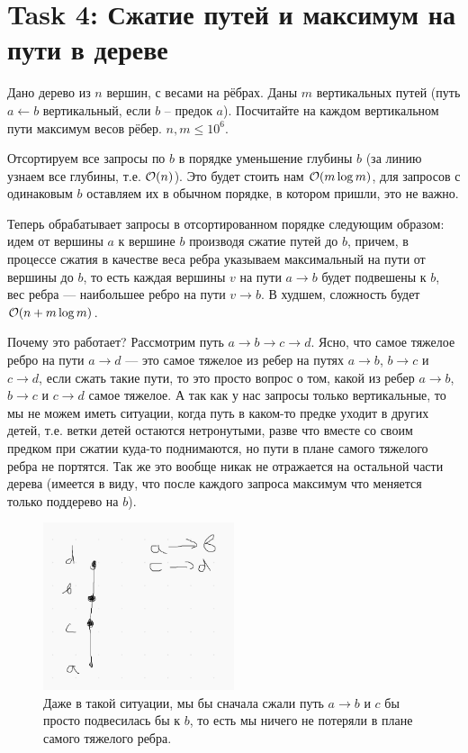 \section{Task 4: Сжатие путей и максимум на пути в дереве}
\begin{task}
    Дано дерево из $n$ вершин, с весами на рёбрах.
    Даны $m$ вертикальных путей (путь $a \leftarrow b$ вертикальный, если $b$ – предок $a$).
    Посчитайте на каждом вертикальном пути максимум весов рёбер. $n, m \leq 10^6$.
\end{task}

\begin{solution}
    Отсортируем все запросы по $b$ в порядке уменьшение глубины $b$ (за линию узнаем все глубины, т.е. $\mathcal{O}(n)$).
    Это будет стоить нам $\mathcal{O}(m\log m)$, для запросов с одинаковым $b$ оставляем их в обычном порядке, в котором пришли, это не важно.

    Теперь обрабатывает запросы в отсортированном порядке следующим образом: идем от вершины $a$ к вершине $b$ производя сжатие путей до $b$, причем, в процессе сжатия в качестве веса ребра указываем максимальный на пути от вершины до $b$, то есть каждая вершины $v$ на пути $a \rightarrow b$ будет подвешены к $b$, вес ребра --- наибольшее ребро на пути $v \rightarrow b$. В худшем, сложность будет $\mathcal{O}(n + m\log m)$.

    Почему это работает? Рассмотрим путь $a \rightarrow b \rightarrow c \rightarrow d$. Ясно, что самое тяжелое ребро на пути $a \rightarrow d$ --- это самое тяжелое из ребер на путях $a \rightarrow b$, $b \rightarrow c$ и $c \rightarrow d$, если сжать такие пути, то это просто вопрос о том, какой из ребер $a \rightarrow b$, $b \rightarrow c$ и $c \rightarrow d$ самое тяжелое. А так как у нас запросы только вертикальные, то мы не можем иметь ситуации, когда путь в каком-то предке уходит в других детей, т.е. ветки детей остаются нетронутыми, разве что вместе со своим предком при сжатии куда-то поднимаются, но пути в плане самого тяжелого ребра не портятся. Так же это вообще никак не отражается на остальной части дерева (имеется в виду, что после каждого запроса максимум что меняется только поддерево на $b$).

    \begin{figure}[H]
        \centering
        \includegraphics[width=0.5\textwidth]{pics/task4.png}
        \caption{Даже в такой ситуации, мы бы сначала сжали путь $a \rightarrow b$ и $c$ бы просто подвесилась бы к $b$, то есть мы ничего не потеряли в плане самого тяжелого ребра.}
    \end{figure}
\end{solution}